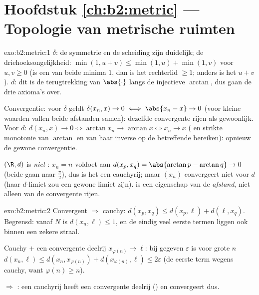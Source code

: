 \section*{Hoofdstuk \ref{ch:b2:metric} --- Topologie van metrische ruimten}

\begin{solution}{exo:b2:metric:1}
$\delta$: de symmetrie en de scheiding zijn duidelijk; de
driehoeksongelijkheid: $\min(1, u + v) \leq \min(1,u) + \min(1,v)$
voor $u, v \geq 0$ (is een van beide minima $1$, dan is het
rechterlid $\geq 1$; anders is het $u + v$). $d$: dit is de
terugtrekking van $\abs{\cdot}$ langs de injectieve $\arctan$, dus
gaan de drie axioma's over.

Convergentie: voor $\delta$ geldt $\delta(x_n, x) \to 0 \iff
\abs{x_n - x} \to 0$ (voor kleine waarden vallen beide afstanden
samen): dezelfde convergente rijen als gewoonlijk. Voor $d$:
$d(x_n, x) \to 0 \iff \arctan x_n \to \arctan x \iff x_n \to x$
( en strikte monotonie van $\arctan$ en van haar
inverse op de betreffende bereiken): opnieuw de gewone
convergentie.

$(\R, d)$ is \emph{niet} : $x_n = n$ voldoet aan $d(x_p,
x_q) = \abs{\arctan p - \arctan q} \to 0$ (beide gaan naar
$\frac\pi2$), dus is het een cauchyrij; maar $(x_n)$ convergeert
niet voor $d$ (haar $d$-limiet zou een gewone limiet zijn).
 is een eigenschap van de \emph{afstand}, niet alleen
van de convergente rijen.
\end{solution}

\begin{solution}{exo:b2:metric:2}
Convergent $\Rightarrow$ cauchy: $d(x_p, x_q) \leq d(x_p, \ell) +
d(\ell, x_q)$. Begrensd: vanaf $N$ is $d(x_n, \ell) \leq 1$, en de
eindig veel eerste termen liggen ook binnen een zekere straal.

Cauchy $+$ een convergente deelrij $x_{\varphi(n)} \to \ell$: bij
gegeven $\varepsilon$ is voor grote $n$ $d(x_n, \ell) \leq d(x_n,
x_{\varphi(n)}) + d(x_{\varphi(n)}, \ell) \leq 2\varepsilon$ (de
eerste term wegens cauchy, want $\varphi(n) \geq n$).

 $\Rightarrow$ : een cauchyrij heeft een convergente
deelrij () en convergeert dus.
\end{solution}

